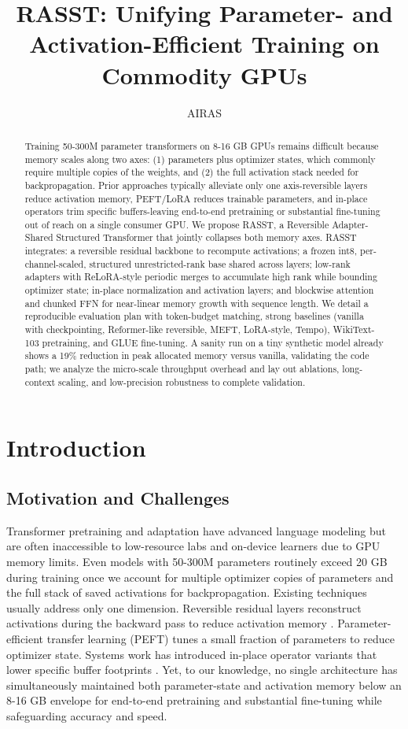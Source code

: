 \documentclass{article}
\title{RASST: Unifying Parameter- and Activation-Efficient Training on Commodity GPUs}
\author{AIRAS}
\begin{document}
\maketitle

\begin{abstract}
Training 50-300M parameter transformers on 8-16 GB GPUs remains difficult because memory scales along two axes: (1) parameters plus optimizer states, which commonly require multiple copies of the weights, and (2) the full activation stack needed for backpropagation. Prior approaches typically alleviate only one axis-reversible layers reduce activation memory, PEFT/LoRA reduces trainable parameters, and in-place operators trim specific buffers-leaving end-to-end pretraining or substantial fine-tuning out of reach on a single consumer GPU. We propose RASST, a Reversible Adapter-Shared Structured Transformer that jointly collapses both memory axes. RASST integrates: a reversible residual backbone to recompute activations; a frozen int8, per-channel-scaled, structured unrestricted-rank base shared across layers; low-rank adapters with ReLoRA-style periodic merges to accumulate high rank while bounding optimizer state; in-place normalization and activation layers; and blockwise attention and chunked FFN for near-linear memory growth with sequence length. We detail a reproducible evaluation plan with token-budget matching, strong baselines (vanilla with checkpointing, Reformer-like reversible, MEFT, LoRA-style, Tempo), WikiText-103 pretraining, and GLUE fine-tuning. A sanity run on a tiny synthetic model already shows a 19\% reduction in peak allocated memory versus vanilla, validating the code path; we analyze the micro-scale throughput overhead and lay out ablations, long-context scaling, and low-precision robustness to complete validation.
\end{abstract}

\section{Introduction}
\subsection{Motivation and Challenges}
Transformer pretraining and adaptation have advanced language modeling but are often inaccessible to low-resource labs and on-device learners due to GPU memory limits. Even models with 50-300M parameters routinely exceed 20 GB during training once we account for multiple optimizer copies of parameters and the full stack of saved activations for backpropagation. Existing techniques usually address only one dimension. Reversible residual layers reconstruct activations during the backward pass to reduce activation memory \cite{kitaev-2020-reformer}. Parameter-efficient transfer learning (PEFT) tunes a small fraction of parameters to reduce optimizer state. Systems work has introduced in-place operator variants that lower specific buffer footprints \cite{andoorveedu-2022-tempo}. Yet, to our knowledge, no single architecture has simultaneously maintained both parameter-state and activation memory below an 8-16 GB envelope for end-to-end pretraining and substantial fine-tuning while safeguarding accuracy and speed.
\end{document}

